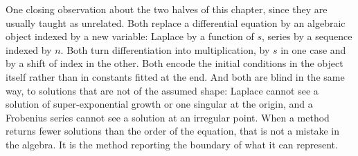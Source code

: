 One closing observation about the two halves of this chapter, since they are usually taught as unrelated. Both replace a differential equation by an algebraic object indexed by a new variable: Laplace by a function of $s$, series by a sequence indexed by $n$. Both turn differentiation into multiplication, by $s$ in one case and by a shift of index in the other. Both encode the initial conditions in the object itself rather than in constants fitted at the end. And both are blind in the same way, to solutions that are not of the assumed shape: Laplace cannot see a solution of super-exponential growth or one singular at the origin, and a Frobenius series cannot see a solution at an irregular point. When a method returns fewer solutions than the order of the equation, that is not a mistake in the algebra. It is the method reporting the boundary of what it can represent.

